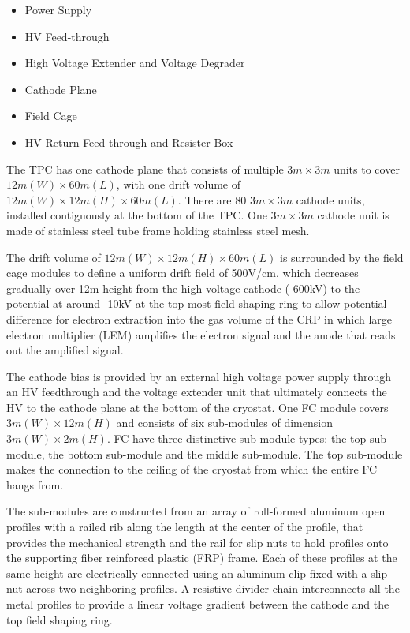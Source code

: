 \begin{itemize}
\item Power Supply

\item HV Feed-through

\item High Voltage Extender and Voltage Degrader

\item Cathode Plane

\item Field Cage

\item HV Return Feed-through and Resister Box

\end{itemize}

The TPC has one cathode plane that consists of multiple $3m\times 3m$ units to cover $12m (W) \times 60m (L)$, with one drift volume of $12m(W)\times 12m (H)\times 60m(L)$. There are 80 $3m\times 3m$ cathode units, installed contiguously at the bottom of the TPC. One $3m\times 3m$ cathode unit is made of stainless steel tube frame holding stainless steel mesh.


The drift volume of $12m(W)\times 12m (H)\times 60m(L)$ is surrounded by the field cage modules to define a uniform drift field of 500V/cm, which decreases gradually over 12m height from the high voltage cathode (-600kV) to the potential at around -10kV at the top most field shaping ring to allow potential difference for electron extraction into the gas volume of the CRP in which large electron multiplier (LEM) amplifies the electron signal and the anode that reads out the amplified signal.  


The cathode bias is provided by an external high voltage power supply through an HV feedthrough and the voltage extender unit that ultimately connects the HV to the cathode plane at the bottom of the cryostat.
One FC module covers $3m(W)\times 12m(H)$ and consists of six sub-modules of dimension $3m(W)\times 2m(H)$. FC have three distinctive sub-module types: the top sub-module, the bottom sub-module and the middle sub-module.  The top sub-module makes the connection to the ceiling of the cryostat from which the entire FC hangs from. 


The sub-modules are constructed from an array of roll-formed aluminum open profiles with a railed rib along the length at the center of the profile, that provides the mechanical strength and the rail for slip nuts to hold profiles onto the supporting fiber reinforced plastic (FRP) frame.  Each of these profiles at the same height are electrically connected using an aluminum clip fixed with a slip nut across two neighboring profiles.  A resistive divider chain interconnects all the metal profiles to provide a linear voltage gradient between the cathode and the top field shaping ring.   



